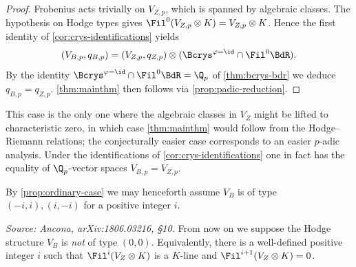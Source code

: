 \begin{proof}
  Frobenius acts trivially on \(V_{Z,p}\), which is spanned by algebraic
  classes. The hypothesis on Hodge types gives \(\Fil^0(V_{Z,p} \otimes K) =
  V_{Z,p} \otimes K\). Hence the first identity of \cref{cor:crys-identifications}
  yields
  \[(V_{B,p}, q_{B,p}) = (V_{Z,p}, q_{Z,p}) \otimes (\Bcrys^{\varphi=\id} \cap
    \Fil^0 \BdR).\]
  By the identity \(\Bcrys^{\varphi=\id} \cap \Fil^0 \BdR = \Q_p\) of
  \cref{thm:bcrys-bdr} we deduce \(q_{B,p} = q_{Z,p}\). \cref{thm:mainthm} then
  follows via \cref{prop:padic-reduction}.
\end{proof}

\begin{remark}
  This case is the only one where the algebraic classes in \(V_Z\) might be
  lifted to characteristic zero, in which case \cref{thm:mainthm} would follow
  from the Hodge--Riemann relations; the conjecturally easier case corresponds
  to an easier \(p\)-adic analysis. Under the identifications of
  \cref{cor:crys-identifications} one in fact has the equality of
  \(\Q_p\)-vector spaces \(V_{B,p} = V_{Z,p}\).
\end{remark}

By \cref{prop:ordinary-case} we may henceforth assume \(V_B\) is of type
\((-i,i),(i,-i)\) for a positive integer \(i\).

\begin{definition}
  \label{ass:i-positive}
  \textit{Source: Ancona, arXiv:1806.03216, \S10.}
  From now on we suppose the Hodge structure \(V_B\) is \emph{not} of type
  \((0,0)\). Equivalently, there is a well-defined positive integer \(i\) such
  that \(\Fil^i(V_Z \otimes K)\) is a \(K\)-line and
  \(\Fil^{i+1}(V_Z \otimes K) = 0\).
\end{definition}

